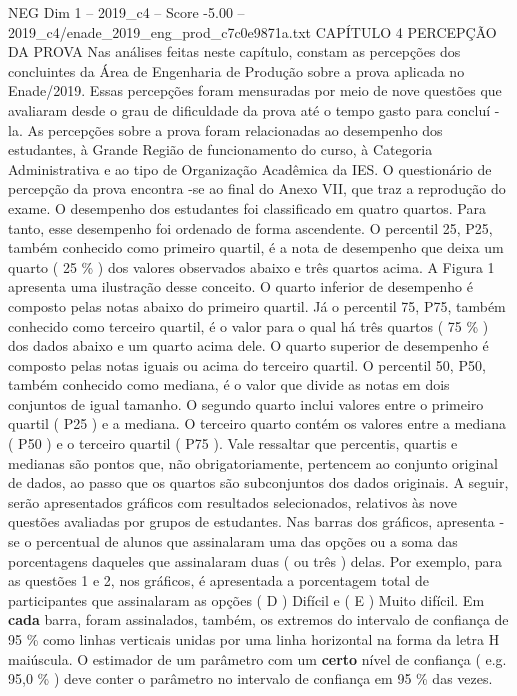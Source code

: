 \begin{textsample}{NEG Dim 1 – 2019\_c4 – Score -5.00 – 2019\_c4/enade\_2019\_eng\_prod\_c7c0e9871a.txt}  \label{ex:f1_neg_085}
CAPÍTULO 4 PERCEPÇÃO DA PROVA Nas análises feitas neste capítulo, constam as percepções dos concluintes da Área de Engenharia de Produção sobre a prova aplicada no Enade/2019.
Essas percepções foram mensuradas por meio de nove questões que avaliaram desde o grau de dificuldade da prova até o tempo gasto para concluí -la.
As percepções sobre a prova foram relacionadas ao desempenho dos estudantes, à Grande Região de funcionamento do curso, à Categoria Administrativa e ao tipo de Organização Acadêmica da IES.
O questionário de percepção da prova encontra -se ao final do Anexo VII, que traz a reprodução do exame.
O desempenho dos estudantes foi classificado em quatro quartos.
Para tanto, esse desempenho foi ordenado de forma ascendente.
O percentil 25, P25, também conhecido como primeiro quartil, é a nota de desempenho que deixa um quarto ( 25 \% ) dos valores observados abaixo e três quartos acima.
A Figura 1 apresenta uma ilustração desse conceito.
O quarto inferior de desempenho é composto pelas notas abaixo do primeiro quartil.
Já o percentil 75, P75, também conhecido como terceiro quartil, é o valor para o qual há três quartos ( 75 \% ) dos dados abaixo e um quarto acima dele.
O quarto superior de desempenho é composto pelas notas iguais ou acima do terceiro quartil.
O percentil 50, P50, também conhecido como mediana, é o valor que divide as notas em dois conjuntos de igual tamanho.
O segundo quarto inclui valores entre o primeiro quartil ( P25 ) e a mediana.
O terceiro quarto contém os valores entre a mediana ( P50 ) e o terceiro quartil ( P75 ).
Vale ressaltar que percentis, quartis e medianas são pontos que, não obrigatoriamente, pertencem ao conjunto original de dados, ao passo que os quartos são subconjuntos dos dados originais.
A seguir, serão apresentados gráficos com resultados selecionados, relativos às nove questões avaliadas por grupos de estudantes.
Nas barras dos gráficos, apresenta -se o percentual de alunos que assinalaram uma das opções ou a soma das porcentagens daqueles que assinalaram duas ( ou três ) delas.
Por exemplo, para as questões 1 e 2, nos gráficos, é apresentada a porcentagem total de participantes que assinalaram as opções ( D ) Difícil e ( E ) Muito difícil.
Em \textbf{cada} barra, foram assinalados, também, os extremos do intervalo de confiança de 95 \% como linhas verticais unidas por uma linha horizontal na forma da letra H maiúscula.
O estimador de um parâmetro com um \textbf{certo} nível de confiança ( e.g. 95,0 \% ) deve conter o parâmetro no intervalo de confiança em 95 \% das vezes.

\end{textsample}
